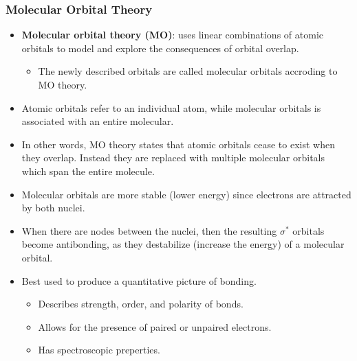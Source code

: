 \documentclass[12pt,a4paper]{article}
\begin{document}
\begin{itemize}
    \subsubsection{Molecular Orbital Theory}
    \begin{itemize}
    \item \textbf{Molecular orbital theory (MO)}: uses linear combinations of atomic orbitals to model and explore the consequences of orbital overlap.
        \begin{itemize}
            \item The newly described orbitals are called {\color{o-Sun}molecular orbitals} accroding to MO theory.
        \end{itemize}
    \item Atomic orbitals refer to an individual atom, while molecular orbitals is associated with an entire molecular.
    \item In other words, MO theory states that atomic orbitals cease to exist when they overlap. Instead they are replaced with multiple molecular orbitals which span the entire molecule.
    \item Molecular orbitals are more stable (lower energy) since electrons are attracted by both nuclei.
    \item When there are {\color{o-Sun}nodes} between the nuclei, then the resulting $\sigma^*$ orbitals become {\color{o-Sun}antibonding}, as they {\color{o-Sun}destabilize} (increase the energy) of a molecular orbital.
    \item Best used to produce a quantitative picture of bonding.
        \begin{itemize}
            \item Describes strength, order, and polarity of bonds.
            \item Allows for the presence of paired or unpaired electrons.
            \item Has spectroscopic preperties.
        \end{itemize}
    \end{itemize}

\end{itemize}
\end{document}
